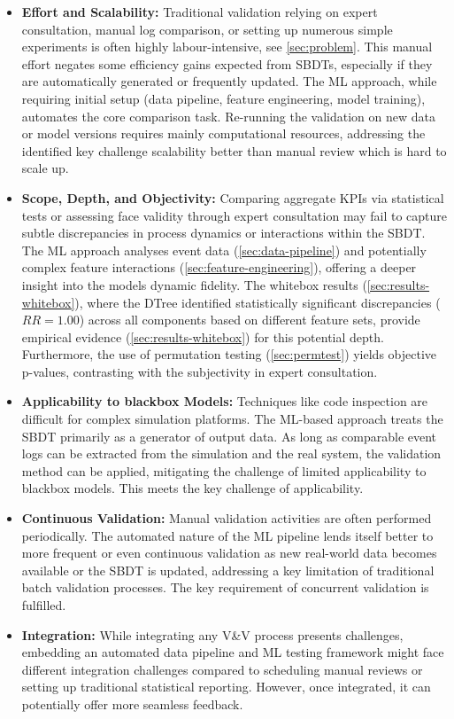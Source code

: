 \begin{itemize}
  \item \textbf{Effort and Scalability:} Traditional validation relying on expert consultation, manual log comparison, or setting up numerous simple experiments is often highly labour-intensive, see \autoref{sec:problem}. This manual effort negates some efficiency gains expected from SBDTs, especially if they are automatically generated or frequently updated. The ML approach, while requiring initial setup (data pipeline, feature engineering, model training), automates the core comparison task. Re-running the validation on new data or model versions requires mainly computational resources, addressing the identified key challenge scalability better than manual review which is hard to scale up.

  \item \textbf{Scope, Depth, and Objectivity:} Comparing aggregate KPIs via statistical tests or assessing face validity through expert consultation may fail to capture subtle discrepancies in process dynamics or interactions within the SBDT. The ML approach analyses event data (\autoref{sec:data-pipeline}) and potentially complex feature interactions (\autoref{sec:feature-engineering}), offering a deeper insight into the models dynamic fidelity. The whitebox results (\autoref{sec:results-whitebox}), where the DTree identified statistically significant discrepancies ($RR=1.00$) across all components based on different feature sets, provide empirical evidence (\autoref{sec:results-whitebox}) for this potential depth. Furthermore, the use of permutation testing (\autoref{sec:permtest}) yields objective p-values, contrasting with the subjectivity in expert consultation.

  \item \textbf{Applicability to blackbox Models:} Techniques like code inspection are difficult for complex simulation platforms. The ML-based approach treats the SBDT primarily as a generator of output data. As long as comparable event logs can be extracted from the simulation and the real system, the validation method can be applied, mitigating the challenge of limited applicability to blackbox models. This meets the key challenge of applicability.

  \item \textbf{Continuous Validation:} Manual validation activities are often performed periodically. The automated nature of the ML pipeline lends itself better to more frequent or even continuous validation as new real-world data becomes available or the SBDT is updated, addressing a key limitation of traditional batch validation processes. The key requirement of concurrent validation is fulfilled.

  \item \textbf{Integration:} While integrating any V\&V process presents challenges, embedding an automated data pipeline and ML testing framework might face different integration challenges compared to scheduling manual reviews or setting up traditional statistical reporting. However, once integrated, it can potentially offer more seamless feedback.
\end{itemize}

